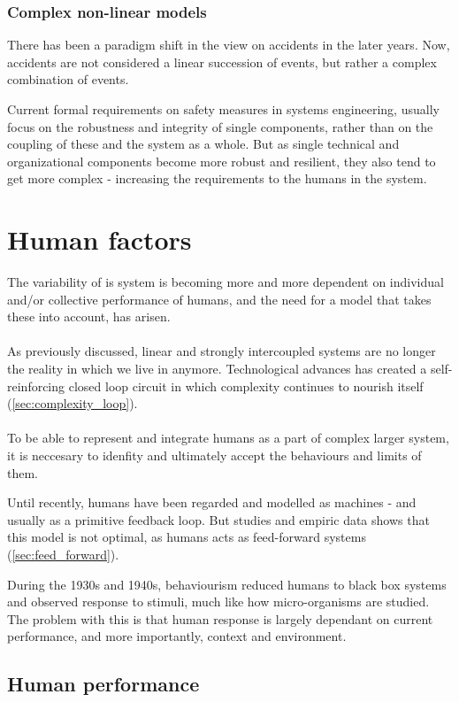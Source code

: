 \documentclass[10pt,oneside]{book}                  %
\begin{document}
\subsection{Complex non-linear models}
There has been a paradigm shift in the view on accidents in the later years. Now, accidents are not considered a linear succession of events, but rather a complex combination of events.

Current formal requirements on safety measures in systems engineering, usually focus on the robustness and integrity of single components, rather than on the coupling of these and the system as a whole. But as single technical and organizational components become more robust and resilient, they also tend to get more complex - increasing the requirements to the humans in the system.

\markboth{}{}
\chapter{Human factors}
The variability of is system is becoming more and more dependent on individual and/or collective performance of humans, and the need for a model that takes these into account, has arisen.\\
\\
As previously discussed, linear and strongly intercoupled systems are no longer the reality in which we live in anymore. Technological advances has created a self-reinforcing closed loop circuit in which complexity continues to nourish itself (\ref{sec:complexity_loop}).\\
\\
To be able to represent and integrate humans as a part of complex larger system, it is neccesary to idenfity and ultimately accept the behaviours and limits of them.

Until recently, humans have been regarded and modelled as machines - and usually as a primitive feedback loop. But studies and empiric data shows that this model is not optimal, as humans acts as feed-forward systems (\ref{sec:feed_forward}).

During the 1930s and 1940s, behaviourism reduced humans to black box systems and observed response to stimuli, much like how micro-organisms are studied. The problem with this is that human response is largely dependant on current performance, and more importantly, context and environment.

\section{Human performance}
\label{sec:human_performance}
\end{document}
